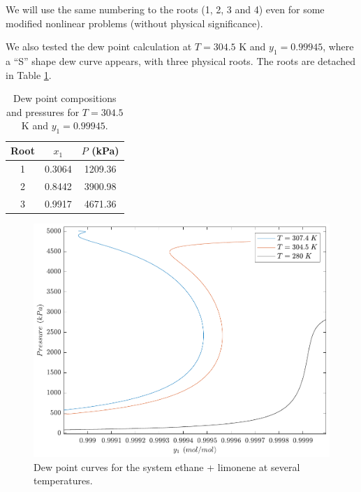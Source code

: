 \documentclass{article}
\theoremstyle{definition}
\theoremstyle{remark}
\begin{document}
We will use the same numbering to the roots (1, 2, 3 and 4) even for some modified nonlinear problems (without physical significance).

We also tested the dew point calculation at $T = 304.5$ K and $y_1 = 0.99945$, where a ``S'' shape dew curve appears, with three physical roots. The roots are detached in Table \ref{tab:roots_S}.

\begin{table}[http!]
	\begin{center}
	\begin{tabular}{ccc} \hline \small
Root & $x_1$ & $P$ (kPa) \\
\hline
1 & 0.3064 & 1209.36 \\
2 & 0.8442 & 3900.98 \\
3 & 0.9917 & 4671.36 \\
	\hline
	\end{tabular}
	\caption{ {\small Dew point compositions and pressures for $T = 304.5$ K and $y_1 = 0.99945$.}}\label{tab:roots_S}
	\end{center}
\end{table}

\begin{figure}
	\begin{center}
		\includegraphics[scale=0.50]{curvas_ponto_orvalho.pdf}
		\caption{Dew point curves for the system ethane + limonene at several temperatures.}\label{fig:dew_point_curve}
	\end{center}
\end{figure}
\end{document}

